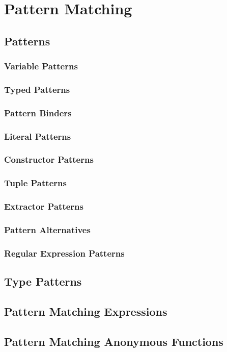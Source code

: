 
\chapter{Pattern Matching}

\section{Patterns}
\label{sec:patterns}

\subsection{Variable Patterns}

\subsection{Typed Patterns}

\subsection{Pattern Binders}

\subsection{Literal Patterns}

\subsection{Constructor Patterns}

\subsection{Tuple Patterns}

\subsection{Extractor Patterns}
\label{sec:extractor-patterns}

\subsection{Pattern Alternatives}

\subsection{Regular Expression Patterns}

\section{Type Patterns}

\section{Pattern Matching Expressions}

\section{Pattern Matching Anonymous Functions}



